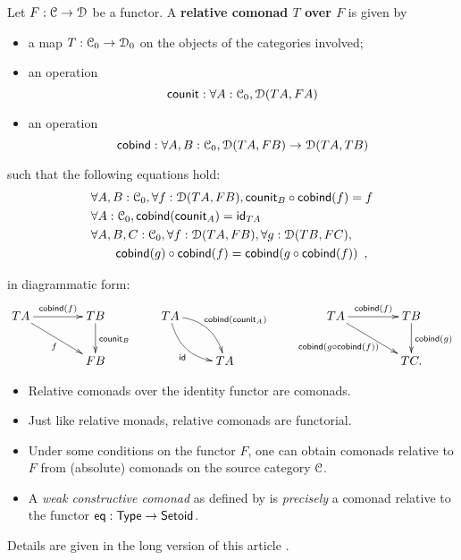 \documentclass[a4paper,USenglish]{lipics}
\newcommand{\fat}[1]{\textbf{#1}}
\newcommand{\itemizedist}{.5em}
\begin{document}
\begin{defn}%
 \label{def:rel_comonad}
  Let $F:\C\to\D$ be a functor. A \fat{relative comonad $T$ over $F$} is given by
  \begin{itemize}%
   \item a map $T:\C_0 \to \D_0$ on the objects of the categories involved;
   \item an operation \[\counit : \forall A : \C_0, \D(TA,FA)\]
   \item an operation \[\cobind: \forall A,B:\C_0, \D(TA,FB) \to \D(TA,TB)\]
  \end{itemize}
   such that the following equations hold:
 \begin{align}
  & \forall A,B:\C_0, \forall f:\D(TA,FB), \comp{\cobind(f)}{\counit_B} = f \\
  & \forall A : \C_0, \cobind(\counit_A) = \id_{TA} \\
  & \forall A,B,C:\C_0, \forall f : \D(TA,FB),\forall g:\D(TB,FC), \notag \\
  &  \qquad    \comp{\cobind(f)}{\cobind(g)} = \cobind(\comp{\cobind(f)}{g}) \enspace ,
 \end{align}
   
  in diagrammatic form:
\[ \begin{xy}
    \xymatrix@C=4em{
                       TA \ar[r]^{\cobind(f)} \ar[rd]_{f}& TB \ar[d]^{\counit_B} \\
                          & FB
    }
    \end{xy}
    \qquad
    \begin{xy}
    \xymatrix{
                       TA \ar@/^1pc/[rd]^{\cobind(\counit_A)} \ar@/_1pc/[rd]_{\id}& \\
                          & TA
    }
   \end{xy}
   \qquad
   \begin{xy}
    \xymatrix@C=4em{
       TA \ar[r]^{\cobind(f)} \ar[rd]_{\cobind(\comp{\cobind(f)}{g})\;\;\;\;}& TB \ar[d]^{\cobind(g)} \\
          & TC .
    }
   \end{xy}
\]
\end{defn}

\begin{Short}
\begin{rem}\label{def:lift}
 \begin{itemize}
  \item Relative comonads over the identity functor are comonads.
  \item Just like relative monads, relative comonads are functorial.
  \item Under some conditions on the functor $F$, one can obtain comonads relative to $F$ from (absolute) comonads on the 
 source category $\C$.
  \item A \emph{weak constructive comonad} as defined by \textcite{DBLP:conf/types/MatthesP11}  is \emph{precisely}
  a comonad relative to the functor $\eq : \Set\to\Setoid$.
 \end{itemize}
\noindent
Details are given in the long version of this article \parencite{trimat_coq}.
\end{rem}
\end{Short}
\end{document}
